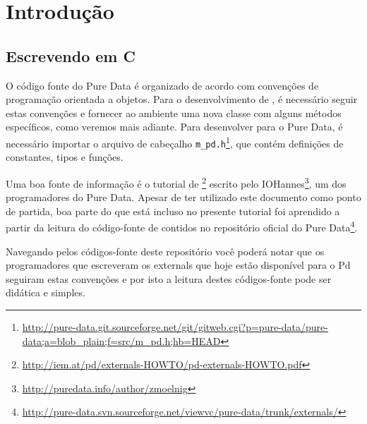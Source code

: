  
\chapter{Introdução}



\section{Escrevendo \externals em C}

O código fonte do Pure Data é organizado de acordo com convenções de
programação orientada a objetos.
Para o desenvolvimento de \externals, é necessário seguir estas convenções e
fornecer ao ambiente uma nova classe com alguns métodos específicos, como
veremos mais adiante.
Para desenvolver para o Pure Data, é necessário importar o arquivo de cabeçalho
\texttt{m\_pd.h}\footnote{\url{http://pure-data.git.sourceforge.net/git/gitweb.cgi?p=pure-data/pure-data;a=blob\_plain;f=src/m\_pd.h;hb=HEAD}},
que contém definições de constantes, tipos e funções.

Uma boa fonte de informação é o tutorial de
\externals\footnote{\url{http://iem.at/pd/externals-HOWTO/pd-externals-HOWTO.pdf}}
escrito pelo IOHannes\footnote{\url{http://puredata.info/author/zmoelnig}}, um dos
programadores do Pure Data.
Apesar de ter utilizado este documento como ponto de partida, boa parte do que
está incluso no presente tutorial foi aprendido a partir da leitura do
código-fonte de \externals contidos no repositório oficial do Pure
Data\footnote{\url{http://pure-data.svn.sourceforge.net/viewvc/pure-data/trunk/externals/}}.

Navegando pelos códigos-fonte deste repositório você poderá notar que os programadores
que escreveram os externals que hoje estão disponível para o Pd seguiram estas convenções
e por isto a leitura destes códigos-fonte pode ser didática e simples.

